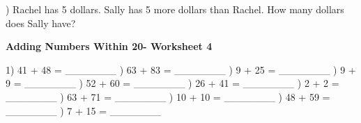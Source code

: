 \documentclass{article}%
\begin{document}
\newline%
\newline%
) Rachel has 5 dollars. Sally has 5 more dollars than Rachel. How many dollars does Sally have?%
\newline%
\newline%
\newline%
\pagebreak%
\large%
\begin{center}%
\textbf{Adding Numbers Within 20- Worksheet 4}%
\newline%
\newline%
\newline%
\end{center} \normalsize%
1) 41 + 48 = \_\_\_\_\_\_\_%
\newline%
\newline%
) 63 + 83 = \_\_\_\_\_\_\_%
\newline%
\newline%
) 9 + 25 = \_\_\_\_\_\_\_%
\newline%
\newline%
) 9 + 9 = \_\_\_\_\_\_\_%
\newline%
\newline%
) 52 + 60 = \_\_\_\_\_\_\_%
\newline%
\newline%
) 26 + 41 = \_\_\_\_\_\_\_%
\newline%
\newline%
) 2 + 2 = \_\_\_\_\_\_\_%
\newline%
\newline%
) 63 + 71 = \_\_\_\_\_\_\_%
\newline%
\newline%
) 10 + 10 = \_\_\_\_\_\_\_%
\newline%
\newline%
) 48 + 59 = \_\_\_\_\_\_\_%
\newline%
\newline%
) 7 + 15 = \_\_\_\_\_\_\_%
\newline%
\end{document}
